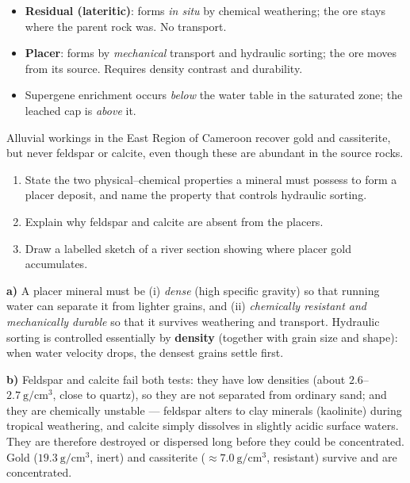 \documentclass[11pt]{article}
\begin{document}
\begin{attention}
\begin{itemize}
\item \textbf{Residual (lateritic)}: forms \emph{in situ} by chemical weathering; the ore stays where the parent rock was. No transport.
\item \textbf{Placer}: forms by \emph{mechanical} transport and hydraulic sorting; the ore moves from its source. Requires density contrast and durability.
\item Supergene enrichment occurs \emph{below} the water table in the saturated zone; the leached cap is \emph{above} it.
\end{itemize}
\end{attention}

\begin{exoresolu}
Alluvial workings in the East Region of Cameroon recover gold and cassiterite, but never feldspar or calcite, even though these are abundant in the source rocks.
\begin{enumerate}
\item[a)] State the two physical--chemical properties a mineral must possess to form a placer deposit, and name the property that controls hydraulic sorting.
\item[b)] Explain why feldspar and calcite are absent from the placers.
\item[c)] Draw a labelled sketch of a river section showing where placer gold accumulates.
\end{enumerate}
\tcblower
\textbf{a)} A placer mineral must be (i) \emph{dense} (high specific gravity) so that running water can separate it from lighter grains, and (ii) \emph{chemically resistant and mechanically durable} so that it survives weathering and transport. Hydraulic sorting is controlled essentially by \textbf{density} (together with grain size and shape): when water velocity drops, the densest grains settle first.

\textbf{b)} Feldspar and calcite fail both tests: they have low densities (about $2.6$--$2.7\ \mathrm{g/cm^3}$, close to quartz), so they are not separated from ordinary sand; and they are chemically unstable — feldspar alters to clay minerals (kaolinite) during tropical weathering, and calcite simply dissolves in slightly acidic surface waters. They are therefore destroyed or dispersed long before they could be concentrated. Gold ($19.3\ \mathrm{g/cm^3}$, inert) and cassiterite ($\approx 7.0\ \mathrm{g/cm^3}$, resistant) survive and are concentrated.


\end{exoresolu}
\end{document}
